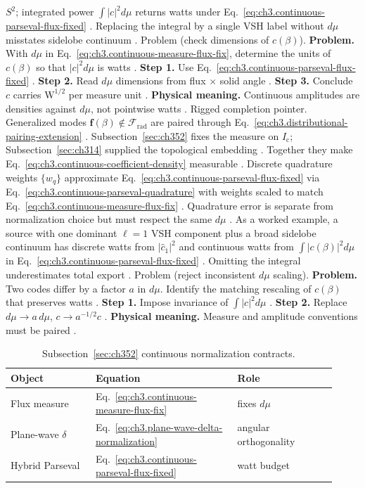 \(S^{2}\); integrated power \(\int|c|^{2}d\mu\) returns watts under Eq.~\eqref{eq:ch3.continuous-parseval-flux-fixed}
\cite{jackson1999}. Replacing the integral by a single VSH label without \(d\mu\) misstates sidelobe
continuum \cite{hansen1988}.
Problem (check dimensions of \(c(\beta)\)). \textbf{Problem.} With \(d\mu\) in Eq.~\eqref{eq:ch3.continuous-measure-flux-fix}, determine the units of \(c(\beta)\)
so that \(|c|^{2}d\mu\) is watts \cite{jackson1999}.
\textbf{Step 1.} Use Eq.~\eqref{eq:ch3.continuous-parseval-flux-fixed} \cite{stratton1941}.
\textbf{Step 2.} Read \(d\mu\) dimensions from flux \(\times\) solid angle \cite{jackson1999}.
\textbf{Step 3.} Conclude \(c\) carries \(\mathrm{W}^{1/2}\) per measure unit \cite{hansen1988}.
\textbf{Physical meaning.} Continuous amplitudes are densities against \(d\mu\), not pointwise watts
\cite{harrington2001}.
Rigged completion pointer. Generalized modes \(\mathbf{f}(\beta)\notin\mathcal{F}_{\mathrm{rad}}\) are paired through
Eq.~\eqref{eq:ch3.distributional-pairing-extension} \cite{stratton1941}. Subsection~\ref{sec:ch352}
fixes the measure on \(I_{\mathrm{c}}\); Subsection~\ref{sec:ch314} supplied the topological embedding
\cite{hansen1988}. Together they make Eq.~\eqref{eq:ch3.continuous-coefficient-density} measurable
\cite{harrington2001}.
Discrete quadrature weights \(\{w_{q}\}\) approximate Eq.~\eqref{eq:ch3.continuous-parseval-flux-fixed} via
Eq.~\eqref{eq:ch3.continuous-parseval-quadrature} with weights scaled to match
Eq.~\eqref{eq:ch3.continuous-measure-flux-fix} \cite{harrington2001}. Quadrature error is separate from
normalization choice but must respect the same \(d\mu\) \cite{hansen1988}.
As a worked example, a source with one dominant \(\ell=1\) VSH component plus a broad sidelobe continuum has discrete watts from
\(|\widehat{c}_{1}|^{2}\) and continuous watts from \(\int|c(\beta)|^{2}d\mu\) in
Eq.~\eqref{eq:ch3.continuous-parseval-flux-fixed} \cite{stratton1941}. Omitting the integral
underestimates total export \cite{hansen1988}.
Problem (reject inconsistent \(d\mu\) scaling). \textbf{Problem.} Two codes differ by a factor \(a\) in \(d\mu\). Identify the matching rescaling of \(c(\beta)\) that
preserves watts \cite{harrington2001}.
\textbf{Step 1.} Impose invariance of \(\int|c|^{2}d\mu\) \cite{stratton1941}.
\textbf{Step 2.} Replace \(d\mu\to a\,d\mu\), \(c\to a^{-1/2}c\) \cite{hansen1988}.
\textbf{Physical meaning.} Measure and amplitude conventions must be paired \cite{harrington2001}.
\begin{table}[t]
\centering
\caption{Subsection~\ref{sec:ch352} continuous normalization contracts.}
\label{tab:ch3.352-continuous-contracts}
\small
\begin{tabular}{@{}p{0.24\linewidth}p{0.40\linewidth}p{0.28\linewidth}@{}}
\toprule
Object & Equation & Role \\
\midrule
Flux measure & Eq.~\eqref{eq:ch3.continuous-measure-flux-fix} & fixes \(d\mu\) \\
Plane-wave \(\delta\) & Eq.~\eqref{eq:ch3.plane-wave-delta-normalization} & angular orthogonality \\
Hybrid Parseval & Eq.~\eqref{eq:ch3.continuous-parseval-flux-fixed} & watt budget \\
\bottomrule
\end{tabular}
\end{table}
